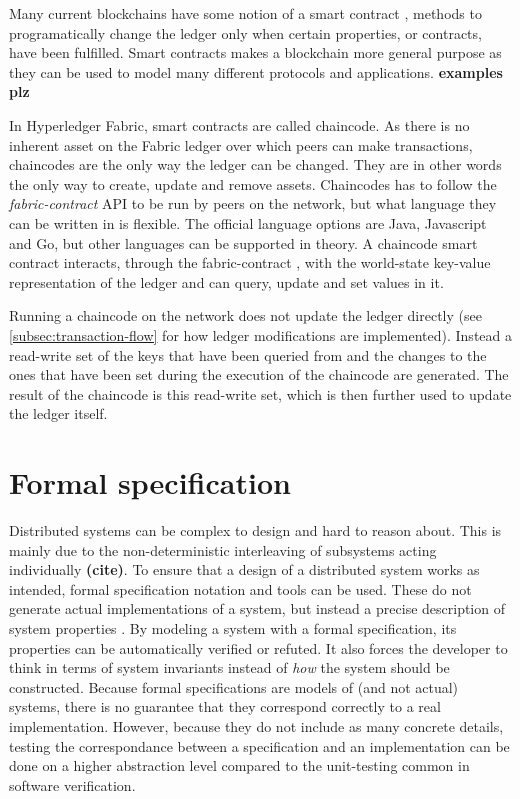 \documentclass[english, biblatex, digitaloutput]{kththesis}
\begin{document}
Many current blockchains have some notion of a smart contract \cite{di_pierro_what_2017}, \ie methods to programatically change the ledger only when certain properties, or contracts, have been fulfilled. Smart contracts makes a blockchain more general purpose as they can be used to model many different protocols and applications. \textbf{examples plz}

In Hyperledger Fabric, smart contracts are called chaincode. As there is no inherent asset on the Fabric ledger over which peers can make transactions, chaincodes are the only way the ledger can be changed. They are in other words the only way to create, update and remove assets. Chaincodes has to follow the \textit{fabric-contract} \gls{API} to be run by peers on the network, but what language they can be written in is flexible. The official language options are Java, Javascript and Go, but other languages can be supported in theory. A chaincode smart contract interacts, through the fabric-contract , with the world-state key-value representation of the ledger and can query, update and set values in it.

Running a chaincode on the network does not update the ledger directly (see \ref{subsec:transaction-flow} for how ledger modifications are implemented). Instead a read-write set of the keys that have been queried from and the changes to the ones that have been set during the execution of the chaincode are generated. The result of the chaincode is this read-write set, which is then further used to update the ledger itself.




\section{Formal specification}

Distributed systems can be complex to design and hard to reason about. This is mainly due to the non-deterministic interleaving of subsystems acting individually \textbf{(cite)}. To ensure that a design of a distributed system works as intended, formal specification notation and tools can be used. These do not generate actual implementations of a system, but instead a precise description of system properties \cite{lamsweerde_formal_2000}. By modeling a system with a formal specification, its properties can be automatically verified or refuted. It also forces the developer to think in terms of system invariants instead of \textit{how} the system should be constructed. Because formal specifications are models of (and not actual) systems, there is no guarantee that they correspond correctly to a real implementation. However, because they do not include as many concrete details, testing the correspondance between a specification and an implementation can be done on a higher abstraction level compared to the unit-testing common in software verification.
\end{document}
